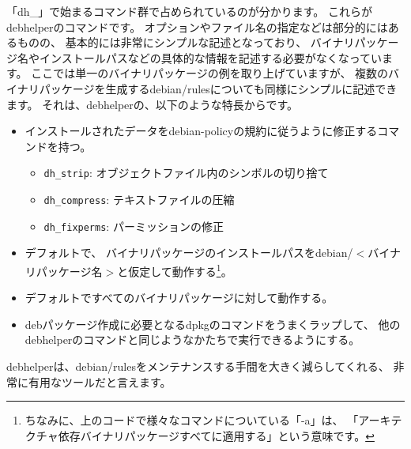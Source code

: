 \documentclass[mingoth,a4paper]{jsarticle}
\begin{document}

「dh\_」で始まるコマンド群で占められているのが分かります。
これらがdebhelperのコマンドです。
オプションやファイル名の指定などは部分的にはあるものの、
基本的には非常にシンプルな記述となっており、
バイナリパッケージ名やインストールパスなどの具体的な情報を記述する必要がなくなっています。
ここでは単一のバイナリパッケージの例を取り上げていますが、
複数のバイナリパッケージを生成するdebian/rulesについても同様にシンプルに記述できます。
それは、debhelperの、以下のような特長からです。

\begin{itemize}
 \item インストールされたデータをdebian-policyの規約に従うように修正するコマンドを持つ。
\begin{itemize}
 \item \texttt{dh\_strip}: オブジェクトファイル内のシンボルの切り捨て
 \item \texttt{dh\_compress}: テキストファイルの圧縮
 \item \texttt{dh\_fixperms}: パーミッションの修正
\end{itemize} 
\item デフォルトで、
  バイナリパッケージのインストールパスをdebian/$<$バイナリパッケージ名$>$と仮定して動作する\footnote{ちなみに、上のコードで様々なコマンドについている「-a」は、
  「アーキテクチャ依存バイナリパッケージすべてに適用する」という意味です。}。
 \item デフォルトですべてのバイナリパッケージに対して動作する。
 \item debパッケージ作成に必要となるdpkgのコマンドをうまくラップして、
  他のdebhelperのコマンドと同じようなかたちで実行できるようにする。
\end{itemize}

debhelperは、debian/rulesをメンテナンスする手間を大きく減らしてくれる、
非常に有用なツールだと言えます。
\end{document}
